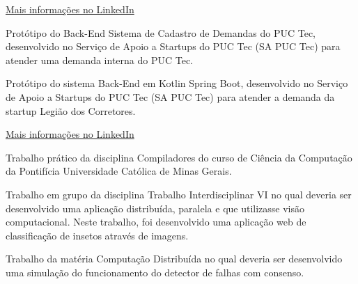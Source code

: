 \documentclass[10pt,a4paper,ragged2e,withhyper]{altacv}
\begin{document}
\begin{paracol}{2}
            {\large\color{emphasis}\href{https://www.linkedin.com/in/henriquemcc/details/projects/}{Mais informações no LinkedIn}}
            


            Protótipo do Back-End Sistema de Cadastro de Demandas do PUC Tec, desenvolvido no Serviço de Apoio a Startups do PUC Tec (SA PUC Tec) para atender uma demanda interna do PUC Tec.\\
            \divider

            Protótipo do sistema Back-End em Kotlin Spring Boot, desenvolvido no Serviço de Apoio a Startups do PUC Tec (SA PUC Tec) para atender a demanda da startup Legião dos Corretores.\\
            \divider

        {\large\color{emphasis}\href{https://www.linkedin.com/in/henriquemcc/details/projects/}{Mais informações no LinkedIn}}


            Trabalho prático da disciplina Compiladores do curso de Ciência da Computação da Pontifícia Universidade Católica de Minas Gerais.\\
            \divider

            Trabalho em grupo da disciplina Trabalho Interdisciplinar VI no qual deveria ser desenvolvido uma aplicação distribuída, paralela e que utilizasse visão computacional. Neste trabalho, foi desenvolvido uma aplicação web de classificação de insetos através de imagens.\\
            \divider

            Trabalho da matéria Computação Distribuída no qual deveria ser desenvolvido uma simulação do funcionamento do detector de falhas com consenso.\\
            \divider


\end{paracol}
\end{document}
